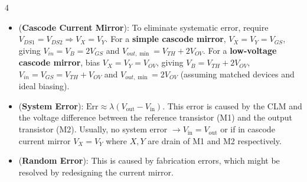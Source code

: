 \documentclass[10pt, landscape]{article}
\begin{document}
\begin{multicols}{4}
\begin{enumerate}
\begin{itemize}
        \item (\textbf{Cascode Current Mirror}): To eliminate systematic error, require $V_{DS1}=V_{DS2}\Rightarrow V_X=V_Y$. For a \textbf{simple cascode mirror}, $V_X=V_Y=V_{GS}$, giving $V_{in}=V_B=2V_{GS}$ and $V_{out,\min}=V_{TH}+2V_{OV}$. For a \textbf{low-voltage cascode mirror}, bias $V_X=V_Y=V_{OV}$, giving $V_B=V_{TH}+2V_{OV}$, $V_{in}=V_{GS}=V_{TH}+V_{OV}$ and $V_{out,\min}=2V_{OV}$ (assuming matched devices and ideal biasing).
        \item (\textbf{System Error}): $\text{Err}\approx\lambda(V_{\text{out}}-V_{\text{in}})$. This error is caused by the CLM and the voltage difference between the reference transistor (M1) and the output transistor (M2). Usually, no system error $\rightarrow V_{\text{in}}=V_{\text{out}}$ or if in cascode current mirror $V_X=V_Y$ where $X, Y$ are drain of M1 and M2 respectively.
        \item (\textbf{Random Error}): This is caused by fabrication errors, which might be resolved by redesigning the current mirror.
    \end{itemize}
\end{enumerate}



\end{multicols}
\end{document}
